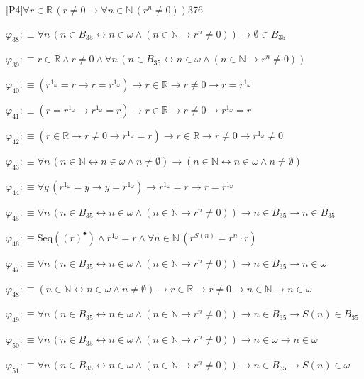 \begin{fullproof}{[P4]}{$\forall r \in \mathbb{R}\,(r \neq 0 \to \forall n \in \mathbb{N}\,({{r}^{n}} \neq 0))$}{376}
\begin{abbrevlist}
\item $\varphi_{38} :\equiv \forall n\,(n \in B_{35} \leftrightarrow n \in \omega \land (n \in \mathbb{N} \to {{r}^{n}} \neq 0)) \to \emptyset \in B_{35}$
\item $\varphi_{39} :\equiv r \in \mathbb{R} \land r \neq 0 \land \forall n\,(n \in B_{35} \leftrightarrow n \in \omega \land (n \in \mathbb{N} \to {{r}^{n}} \neq 0))$
\item $\varphi_{40} :\equiv ({{r}^{1_{\omega}}} = r \to r = {{r}^{1_{\omega}}}) \to r \in \mathbb{R} \to r \neq 0 \to r = {{r}^{1_{\omega}}}$
\item $\varphi_{41} :\equiv (r = {{r}^{1_{\omega}}} \to {{r}^{1_{\omega}}} = r) \to r \in \mathbb{R} \to r \neq 0 \to {{r}^{1_{\omega}}} = r$
\item $\varphi_{42} :\equiv (r \in \mathbb{R} \to r \neq 0 \to {{r}^{1_{\omega}}} = r) \to r \in \mathbb{R} \to r \neq 0 \to {{r}^{1_{\omega}}} \neq 0$
\item $\varphi_{43} :\equiv \forall n\,(n \in \mathbb{N} \leftrightarrow n \in \omega \land n \neq \emptyset) \to (n \in \mathbb{N} \leftrightarrow n \in \omega \land n \neq \emptyset)$
\item $\varphi_{44} :\equiv \forall y\,({{r}^{1_{\omega}}} = y \to y = {{r}^{1_{\omega}}}) \to {{r}^{1_{\omega}}} = r \to r = {{r}^{1_{\omega}}}$
\item $\varphi_{45} :\equiv \forall n\,(n \in B_{35} \leftrightarrow n \in \omega \land (n \in \mathbb{N} \to {{r}^{n}} \neq 0)) \to n \in B_{35} \to n \in B_{35}$
\item $\varphi_{46} :\equiv \mathrm{Seq}({(r)^{\bullet}}) \land {{r}^{1_{\omega}}} = r \land \forall n \in \mathbb{N}\,({{r}^{S(n)}} = {{r}^{n}} \cdot r)$
\item $\varphi_{47} :\equiv \forall n\,(n \in B_{35} \leftrightarrow n \in \omega \land (n \in \mathbb{N} \to {{r}^{n}} \neq 0)) \to n \in B_{35} \to n \in \omega$
\item $\varphi_{48} :\equiv (n \in \mathbb{N} \leftrightarrow n \in \omega \land n \neq \emptyset) \to r \in \mathbb{R} \to r \neq 0 \to n \in \mathbb{N} \to n \in \omega$
\item $\varphi_{49} :\equiv \forall n\,(n \in B_{35} \leftrightarrow n \in \omega \land (n \in \mathbb{N} \to {{r}^{n}} \neq 0)) \to n \in B_{35} \to S(n) \in B_{35}$
\item $\varphi_{50} :\equiv \forall n\,(n \in B_{35} \leftrightarrow n \in \omega \land (n \in \mathbb{N} \to {{r}^{n}} \neq 0)) \to n \in \omega \to n \in \omega$
\item $\varphi_{51} :\equiv \forall n\,(n \in B_{35} \leftrightarrow n \in \omega \land (n \in \mathbb{N} \to {{r}^{n}} \neq 0)) \to n \in B_{35} \to S(n) \in \omega$

\end{abbrevlist}
\end{fullproof}
